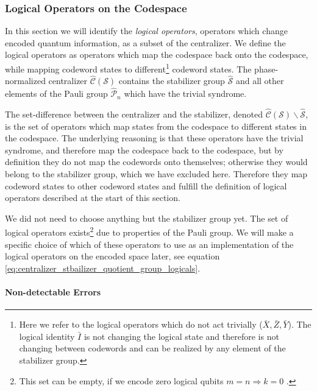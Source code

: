 \subsubsection{Logical Operators on the Codespace}\label{sssec:logical_operators_on_the_codespace_intro}

In this section we will identify the \emph{logical operators}, operators which change encoded quantum information, as a subset of the centralizer. 
We define the logical operators as operators which map the codespace back onto the codespace, while mapping codeword states to different\footnote{
    Here we refer to the logical operators which do not act trivially ($\bar{X}, \bar{Z}, \bar{Y}$). 
    The logical identity $\bar{I}$ is not changing the logical state and therefore is not changing between codewords and can be realized by any element of the stabilizer group.
} codeword states. 
The phase-normalized centralizer $\hat{\mathcal{C}}(\mathcal{S})$ contains the stabilizer group $\hat{\mathcal{S}}$ 
and all other elements of the Pauli group $\hat{\mathcal{P}}_n$ which have the trivial syndrome.

The set-difference between the centralizer and the stabilizer, denoted $\hat{\mathcal{C}}(\mathcal{S})\backslash\hat{\mathcal{S}}$, 
is the set of operators which map states from the codespace to different states in the codespace.
The underlying reasoning is that these operators have the trivial syndrome, and therefore map the codespace back to the codespace, 
but by definition they do not map the codewords onto themselves; otherwise they would belong to the stabilizer group, which we have excluded here.
Therefore they map codeword states to other codeword states and fulfill the definition of logical operators described at the start of this section.

We did not need to choose anything but the stabilizer group yet.
The set of logical operators exists\footnote{This set can be empty, if we encode zero logical qubits $m=n\Rightarrow k=0$ \cite{gottesmann_book}.} due to properties of the Pauli group. 
We will make a specific choice of which of these operators to use as an implementation of the logical operators on the encoded space later, see equation \eqref{eq:centralizer_stbailizer_quotient_group_logicals}. 

\paragraph*{Non-detectable Errors}

